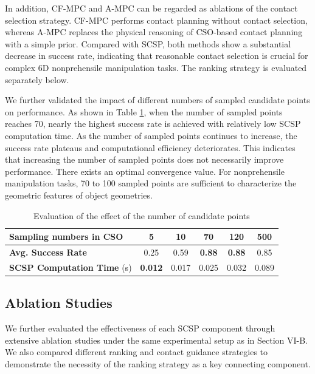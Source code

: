 In addition, CF-MPC and A-MPC can be regarded as ablations of the contact selection strategy. CF-MPC performs contact planning without contact selection, whereas A-MPC replaces the physical reasoning of CSO-based contact planning with a simple prior. Compared with SCSP, both methods show a substantial decrease in success rate, indicating that reasonable contact selection is crucial for complex 6D nonprehensile manipulation tasks. The ranking strategy is evaluated separately below.

We further validated the impact of different numbers of sampled candidate points on performance. As shown in Table \ref{tab:cso_sampling}, when the number of sampled points reaches 70, nearly the highest success rate is achieved with relatively low SCSP computation time. As the number of sampled points continues to increase, the success rate plateaus and computational efficiency deteriorates. This indicates that increasing the number of sampled points does not necessarily improve performance. There exists an optimal convergence value. For nonprehensile manipulation tasks, 70 to 100 sampled points are sufficient to characterize the geometric features of object geometries.


\begin{table}[t]
\centering
\caption{Evaluation of the effect of the number of candidate points}
\label{tab:cso_sampling}
\begin{tabular}{lccccc}
\toprule
\textbf{Sampling numbers in CSO} & \textbf{5} & \textbf{10} & \textbf{70} & \textbf{120} & \textbf{500} \\
\midrule
\textbf{Avg. Success Rate}      & 0.25  & 0.59 & \textbf{0.88} & \textbf{0.88} & 0.85 \\
\textbf{SCSP Computation Time} (s)  & \textbf{0.012} & 0.017 & 0.025 & 0.032 & 0.089 \\
\bottomrule
\end{tabular}
\end{table}


\subsection{Ablation Studies}


We further evaluated the effectiveness of each SCSP component through extensive ablation studies under the same experimental setup as in Section VI-B. We also compared different ranking and contact guidance strategies to demonstrate the necessity of the ranking strategy as a key connecting component.

